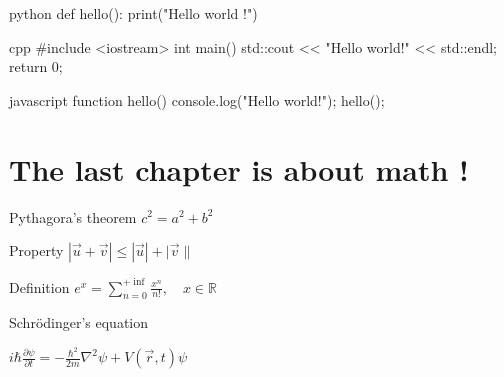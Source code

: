 \begin{mintedbox}{python}
def hello():
    print("Hello world !")
\end{mintedbox}

\begin{mintedbox}{cpp}
#include <iostream>
int main() {
    std::cout << "Hello world!" << std::endl;
    return 0;
}
\end{mintedbox}

\begin{mintedbox}{javascript}
function hello() {
    console.log("Hello world!");
}
hello();
\end{mintedbox}

\chapter{The last chapter is about math !}

\begin{Syntax}{Pythagora's theorem}{}
    $c^2 = a^2 + b^2$
\end{Syntax}

\begin{Input}{Property}{}
    $|\vec{u} + \vec{v}| \le |\vec{u}| + |\vec{v}\|$
\end{Input}

\begin{Output}{Definition}{}
    $e^x = \sum_{n=0}^{+\inf} \frac{x^n}{n!}, \quad x \in \mathbb{R}$
\end{Output}

Schrödinger's equation

\begin{tcolorbox}
    $i\hbar \frac{\partial \psi}{\partial t} = - \frac{\hbar^2}{2m} \nabla^2 \psi + V(\vec{r},t)\psi$
\end{tcolorbox}